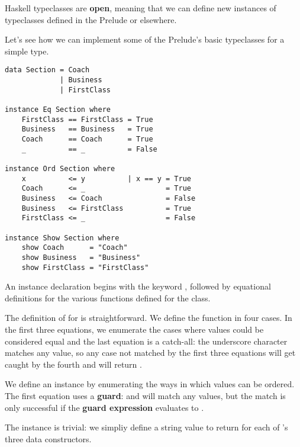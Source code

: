 Haskell typeclasses are \textbf{open}, meaning that we can define new instances of typeclasses defined in the
Prelude or elsewhere.

Let's see how we can implement some of the Prelude's basic typeclasses for a simple type.

\begin{lstlisting}
data Section = Coach
             | Business
             | FirstClass

instance Eq Section where
    FirstClass == FirstClass = True
    Business   == Business   = True
    Coach      == Coach      = True
    _          == _          = False

instance Ord Section where
    x          <= y          | x == y = True
    Coach      <= _                   = True
    Business   <= Coach               = False
    Business   <= FirstClass          = True
    FirstClass <= _                   = False
    
instance Show Section where
    show Coach      = "Coach"
    show Business   = "Business"
    show FirstClass = "FirstClass"
\end{lstlisting}

\begin{notelist}
    \item An instance declaration begins with the keyword , followed by equational
          definitions for the various functions defined for the class.
    \item The definition of \code{(==)} for  is straightforward. We define the function
          in four cases. In the first three equations, we enumerate the cases where values could
          be considered equal and the last equation is a catch-all: the underscore character 
          matches any value, so any case not matched by the first three equations will get caught
          by the fourth and will return .
    \item We define an  instance by enumerating the ways in which  values
          can be ordered. The first equation uses a \textbf{guard}:  and  will match
          any values, but the match is only successful if the \textbf{guard expression} evaluates
          to .
    \item The  instance is trivial: we simpliy define a string value to return for each
          of 's three data constructors.
\end{notelist}

